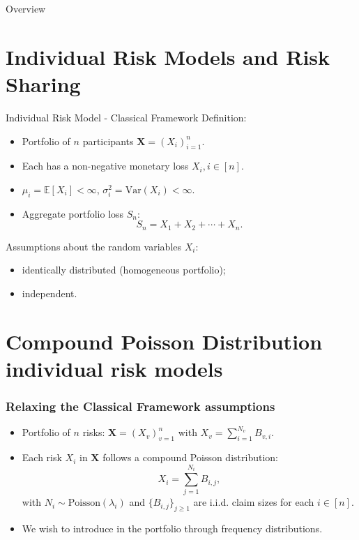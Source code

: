 \documentclass[11pt,xcolor={dvipsnames},hyperref={pdftex,pdfpagemode=UseNone,hidelinks,pdfdisplaydoctitle=true},usepdftitle=false]{beamer}
\begin{document}
\begin{frame}[label=toc]{Overview}
    \setlength{\leftskip}{5cm}%
    \tableofcontents[subsectionstyle=hide]
\end{frame}

\section{Individual Risk Models and Risk Sharing}
\begin{frame}{Individual Risk Model - Classical Framework}
Definition: 
\begin{itemize}
    \item Portfolio of $n$ participants $\boldsymbol{X} = (X_i)_{i=1}^{n}$.
    \item Each has a non-negative monetary loss $X_i, i \in [n]$.
    \item $\mu_i = \mathbb{E}[X_i] < \infty$, $\sigma_i^2 = \mathrm{Var}(X_i) < \infty$.
    \item Aggregate portfolio loss $S_n$:  
    \begin{equation*}
    S_n = X_1 + X_2 + \cdots + X_n.
    \end{equation*}
\end{itemize}
\vfill

\pause

Assumptions about the random variables $X_i$: 
\begin{itemize}
    \item identically distributed (homogeneous portfolio);
    \item independent. 
\end{itemize}
\end{frame}


\section{Compound Poisson Distribution individual risk models}
\begin{frame}
\frametitle{Relaxing the Classical Framework assumptions}
\begin{itemize}
    \item Portfolio of $n$  risks: $\boldsymbol{X} = (X_v)_{v=1}^{n}$ with $X_v = \sum_{i=1}^{N_v} B_{v,i}$.

    \vfill

    \item Each risk $X_i$ in $\boldsymbol{X}$ follows a compound Poisson distribution: 
        \begin{equation*}
        X_i = \sum_{j=1}^{N_i} B_{i,j},
        \end{equation*}
        with $N_i \sim \text{Poisson}(\lambda_i)$ and $ \{B_{i,j}\}_{j \ge 1}$ are i.i.d. claim sizes for each $i \in [n]$.
    

        \pause

        \vfill

    \item We wish to introduce  in the portfolio through frequency distributions.
\end{itemize}

\end{frame}
\end{document}

